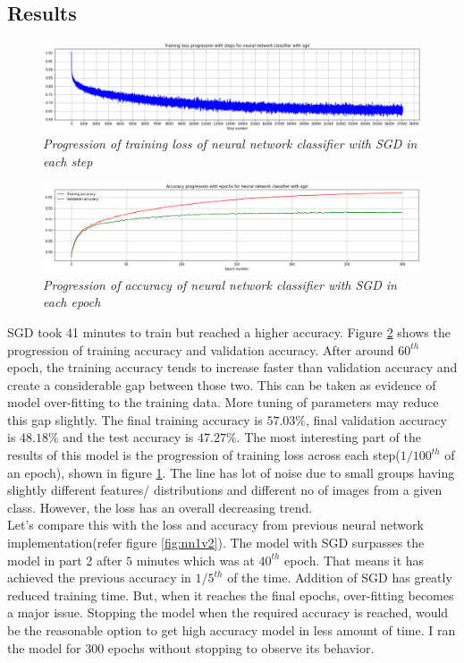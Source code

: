 \documentclass[10pt, a4paper, twocolumn]{article}
\begin{document}
\subsection{Results}
\begin{figure}
  \centering
	\includegraphics[width=.49\textwidth]{./images/nn2Loss.png}
	\caption{\textit{Progression of training loss of neural network classifier with SGD in each step}}
	\label{fig:nn2Loss}
\end{figure}
\begin{figure}
  \centering
	\includegraphics[width=.49\textwidth]{./images/nn2Acc.png}
	\caption{\textit{Progression of accuracy of neural network classifier with SGD in each epoch}}
	\label{fig:nn2Acc}
\end{figure}
SGD took 41 minutes to train but reached a higher accuracy. Figure \ref{fig:nn2Acc} shows the progression of training accuracy and validation accuracy. After around $60^{th}$ epoch, the training accuracy tends to increase faster than validation accuracy and create a considerable gap between those two. This can be taken as evidence of model over-fitting to the training data. More tuning of parameters may reduce this gap slightly. The final training accuracy is $57.03\%$, final validation accuracy is $48.18\%$ and the test accuracy is $47.27\%$. The most interesting part of the results of this model is the progression of training loss across each step($1/100^{th}$ of an epoch), shown in figure \ref{fig:nn2Loss}. The line has lot of noise due to small groups having slightly different features/ distributions and different no of images from a given class. However, the loss has an overall decreasing trend.\\
Let's compare this with the loss and accuracy from previous neural network implementation(refer figure \ref{fig:nn1v2}). The model with SGD surpasses the model in part 2 after $5$ minutes which was at $40^{th}$ epoch. That means it has achieved the previous accuracy in $1/5^{th}$ of the time. Addition of SGD has greatly reduced training time. But, when it reaches the final epochs, over-fitting becomes a major issue. Stopping the model when the required accuracy is reached, would be the reasonable option to get high accuracy model in less amount of time. I ran the model for 300 epochs without stopping to observe its behavior.
\end{document}
